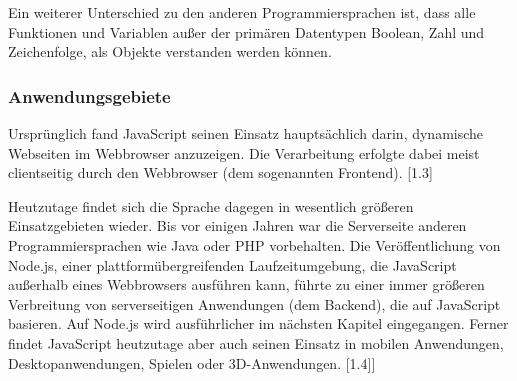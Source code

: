 \noindent
Ein weiterer Unterschied zu den anderen Programmiersprachen ist, dass alle Funktionen und Variablen außer der primären Datentypen Boolean, Zahl und Zeichenfolge, als Objekte verstanden werden können.

\subsubsection{Anwendungsgebiete}
Ursprünglich fand JavaScript seinen Einsatz hauptsächlich darin, dynamische Webseiten im Web\-browser anzuzeigen. Die Verarbeitung erfolgte dabei meist clientseitig durch den Webbrowser (dem sogenannten Frontend). [1.3] 
\newline

\noindent
Heutzutage findet sich die Sprache dagegen in wesentlich größeren Einsatzgebieten wieder. 
Bis vor einigen Jahren war die Serverseite anderen Programmiersprachen wie Java oder PHP vorbehalten. Die Veröffentlichung von Node.js, einer plattformübergreifenden Laufzeitumgebung, die JavaScript außerhalb eines Webbrowsers ausführen kann, führte zu einer immer größeren Verbreitung von serverseitigen Anwendungen (dem Backend), die auf JavaScript basieren. Auf Node.js wird ausführlicher im nächsten Kapitel eingegangen. 
Ferner findet JavaScript heutzutage aber auch seinen Einsatz in mobilen Anwendungen, Desktopanwendungen, Spielen oder 3D-Anwendungen. [1.4]]

